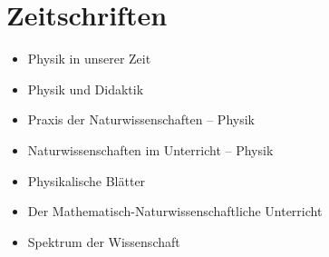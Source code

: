 \section{Zeitschriften}
\begin{itemize}
	\item %
	Physik in unserer Zeit
	\item %
	Physik und Didaktik
	\item %
	Praxis der Naturwissenschaften -- Physik
	\item %
	Naturwissenschaften im Unterricht -- Physik
	\item %
	Physikalische Blätter
	\item %
	Der Mathematisch-Naturwissenschaftliche Unterricht
	\item %
	Spektrum der Wissenschaft
\end{itemize}

%






